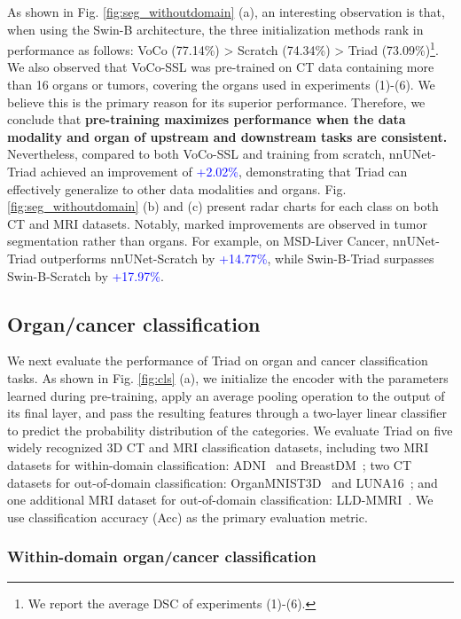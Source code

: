 As shown in Fig. \ref{fig:seg_withoutdomain} (a), an interesting observation is that, when using the Swin-B architecture, the three initialization methods rank in performance as follows: VoCo (77.14\%) > Scratch (74.34\%) > Triad (73.09\%)\footnote{We report the average DSC of experiments (1)-(6).}.
We also observed that VoCo-SSL was pre-trained on CT data containing more than 16 organs or tumors, covering the organs used in experiments (1)-(6). We believe this is the primary reason for its superior performance.
Therefore, we conclude that \textbf{pre-training maximizes performance when the data modality and organ of upstream and downstream tasks are consistent.}
Nevertheless, compared to both VoCo-SSL and training from scratch, nnUNet-Triad achieved an improvement of \textcolor{blue}{+2.02\%}, demonstrating that Triad can effectively generalize to other data modalities and organs.
Fig. \ref{fig:seg_withoutdomain} (b) and (c) present radar charts for each class on both CT and MRI datasets. Notably, marked improvements are observed in tumor segmentation rather than organs.
For example, on MSD-Liver Cancer, nnUNet-Triad outperforms nnUNet-Scratch by \textcolor{blue}{+14.77\%}, while Swin-B-Triad surpasses Swin-B-Scratch by \textcolor{blue}{+17.97\%}.


\subsection{Organ/cancer classification}

We next evaluate the performance of Triad on organ and cancer classification tasks.
As shown in Fig. \ref{fig:cls} (a), we initialize the encoder with the parameters learned during pre-training, apply an average pooling operation to the output of its final layer, and pass the resulting features through a two-layer linear classifier to predict the probability distribution of the categories.
We evaluate Triad on five widely recognized 3D CT and MRI classification datasets, including two MRI datasets for within-domain classification: ADNI~\cite{jack2008alzheimer} and BreastDM~\cite{zhao2023breastdm}; two CT datasets for out-of-domain classification: OrganMNIST3D~\cite{yang2023medmnist} and LUNA16~\cite{setio2017validation}; and one additional MRI dataset for out-of-domain classification: LLD-MMRI~\cite{lou2024sdrformer}.
We use classification accuracy (Acc) as the primary evaluation metric.



\subsubsection{Within-domain organ/cancer classification}

